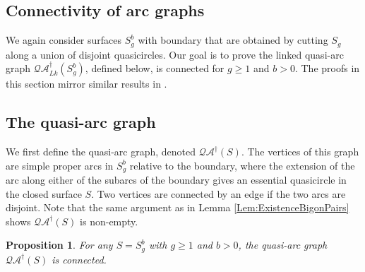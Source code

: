 \documentclass[12pt,a4paper]{amsart}
\theoremstyle{definition}
\theoremstyle{plain}
\newtheorem{proposition}[theorem]{Proposition}
\numberwithin{equation}{section}
\newcommand{\qag}{\mathcal{QA}^{\dagger}}
\newcommand{\lqag}{\mathcal{QA}_{Lk}^{\dagger}}
\begin{document}
\subsection{Connectivity of arc graphs}\label{Subsect:ArcGraphs}
We again consider surfaces $S^b_g$ with boundary that are obtained by cutting $S_g$ along a union of disjoint quasicircles. 
Our goal is to prove the linked quasi-arc graph $\lqag\left(S^b_g\right)$, defined below, is connected for $g\geq 1$ and $b>0$. The proofs in this section mirror similar results in \cite{long2023automorphisms}.

\subsection*{The quasi-arc graph}
We first define the quasi-arc graph, denoted $\qag(S)$.
The vertices of this graph are simple proper arcs in $S_g^b$ relative to the boundary, where the extension of the arc along either of the subarcs of the boundary gives an  essential quasicircle in the closed surface $S$. Two vertices are connected by an edge if the two arcs are disjoint.
Note that the same argument as in Lemma \ref{Lem:ExistenceBigonPairs} shows $\qag(S)$ is non-empty.

\begin{proposition}\label{Prop:QuasiArcGraphConnected}
    For any $S = S_g^b$ with $g\geq1$ and $b>0$, the quasi-arc graph $\qag(S)$ is connected.
\end{proposition}
\end{document}
